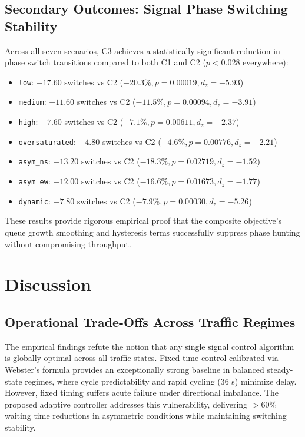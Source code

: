 \documentclass[11pt,journal,onecolumn]{article}
\begin{document}
\subsection{Secondary Outcomes: Signal Phase Switching Stability}
Across all seven scenarios, C3 achieves a statistically significant reduction in phase switch transitions compared to both C1 and C2 ($p < 0.028$ everywhere):
\begin{itemize}
    \item \texttt{low}: $-17.60$ switches vs C2 ($-20.3\%, p = 0.00019, d_z = -5.93$)
    \item \texttt{medium}: $-11.60$ switches vs C2 ($-11.5\%, p = 0.00094, d_z = -3.91$)
    \item \texttt{high}: $-7.60$ switches vs C2 ($-7.1\%, p = 0.00611, d_z = -2.37$)
    \item \texttt{oversaturated}: $-4.80$ switches vs C2 ($-4.6\%, p = 0.00776, d_z = -2.21$)
    \item \texttt{asym\_ns}: $-13.20$ switches vs C2 ($-18.3\%, p = 0.02719, d_z = -1.52$)
    \item \texttt{asym\_ew}: $-12.00$ switches vs C2 ($-16.6\%, p = 0.01673, d_z = -1.77$)
    \item \texttt{dynamic}: $-7.80$ switches vs C2 ($-7.9\%, p = 0.00030, d_z = -5.26$)
\end{itemize}
These results provide rigorous empirical proof that the composite objective's queue growth smoothing and hysteresis terms successfully suppress phase hunting without compromising throughput.

\section{Discussion}
\subsection{Operational Trade-Offs Across Traffic Regimes}
The empirical findings refute the notion that any single signal control algorithm is globally optimal across all traffic states. Fixed-time control calibrated via Webster's formula provides an exceptionally strong baseline in balanced steady-state regimes, where cycle predictability and rapid cycling (36 s) minimize delay. However, fixed timing suffers acute failure under directional imbalance. The proposed adaptive controller addresses this vulnerability, delivering $> 60\%$ waiting time reductions in asymmetric conditions while maintaining switching stability.
\end{document}
